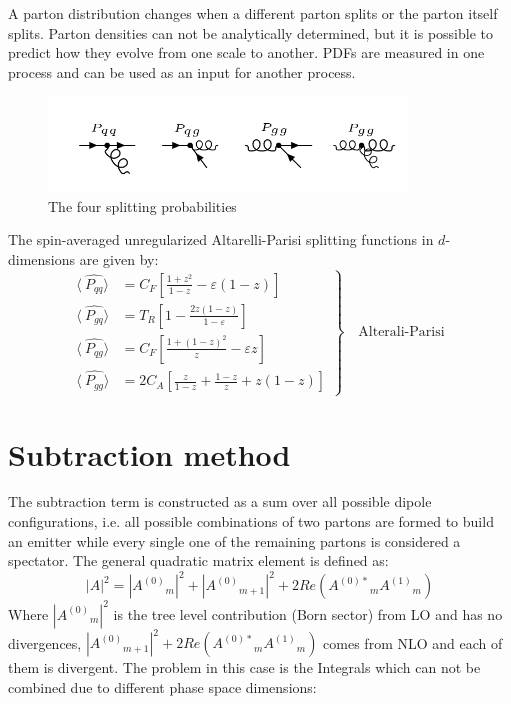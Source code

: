A parton distribution changes when a different parton splits or the parton itself splits. Parton densities can not be analytically determined, but it is possible to predict how they evolve from one scale to another. PDFs are measured in one process and can be used as an input for another process.


\begin{figure}[h!]
\centering
\includegraphics[width=0.85\textwidth]{images/Intro/spiliting.png}
\caption{The four splitting probabilities}
\label{splitting}
\end{figure}
The  spin-averaged  unregularized  Altarelli-Parisi  splitting  functions  in $ d $-dimensions  are given by:
\begin{equation}
	\left.\begin{aligned}
\langle\:\hat{P_{qq}}\rangle &= C_F[\frac{1+z^2}{1-z}-\varepsilon(1-z)]\\
\langle\:\hat{P_{gq}}\rangle &= T_R[1-\frac{2z(1-z)}{1-\varepsilon}]\\
\langle\:\hat{P_{qg}}\rangle &= C_F[\frac{1+(1-z)^2}{z}-\varepsilon z]\\
\langle\:\hat{P_{gg}}\rangle &= 2C_A[\frac{z}{1-z}+\frac{1-z}{z}+z(1-z)]
\end{aligned}
	\right\}
	\quad \text{Alterali-Parisi
	}
\label{Alterali-Parisi}
\end{equation}


\section{Subtraction method}
The subtraction term is constructed as a sum over all possible dipole configurations, i.e. all possible combinations of two partons are formed to build an emitter while every single one of the remaining partons is considered a spectator. The general quadratic matrix element is defined as:
\begin{equation}
|A|^2 = |{A^{(0)}}_m|^2 +  |{A^{(0)}}_{m+1}|^2+ 2Re({A^{(0)*}}_{m}{A^{(1)}}_{m})
\end{equation}
Where $ |{A^{(0)}}_m|^2 $ is the tree level contribution (Born sector) from LO and has no divergences, $ |{A^{(0)}}_{m+1}|^2+ 2Re({A^{(0)*}}_{m}{A^{(1)}}_{m}) $ comes from NLO and each of them is divergent. The problem in this case is the Integrals which can not be combined due to different phase space dimensions:

